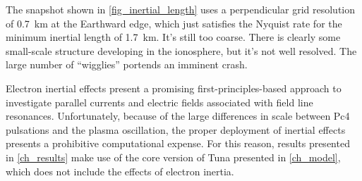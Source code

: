 The snapshot shown in \cref{fig_inertial_length} uses a perpendicular grid resolution of \SI{0.7}{\km} at the Earthward edge, which just satisfies the Nyquist rate for the minimum inertial length of \SI{1.7}{\km}. It's still too coarse. There is clearly some small-scale structure developing in the ionosphere, but it's not well resolved. The large number of ``wigglies'' portends an imminent crash. 

Electron inertial effects present a promising first-principles-based approach to investigate parallel currents and electric fields associated with field line resonances. Unfortunately, because of the large differences in scale between Pc4 pulsations and the plasma oscillation, the proper deployment of inertial effects presents a prohibitive computational expense. For this reason, results presented in \cref{ch_results} make use of the core version of Tuna presented in \cref{ch_model}, which does not include the effects of electron inertia. 



